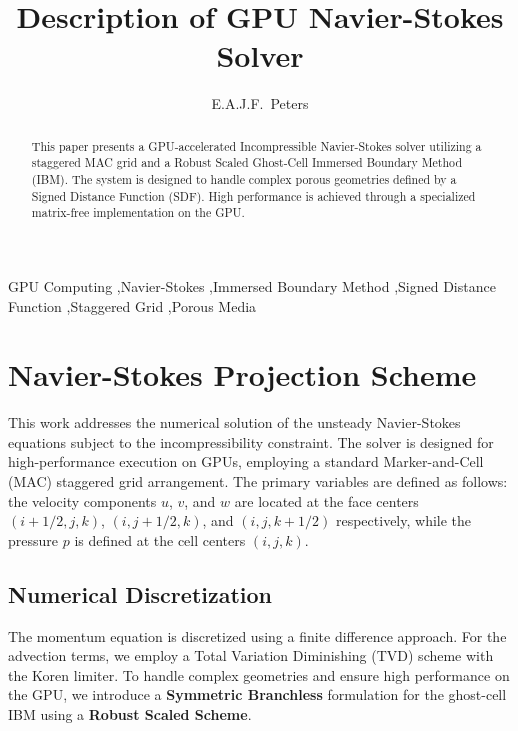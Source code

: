 \documentclass[preprint,12pt]{elsarticle}
\begin{document}
\begin{frontmatter}


\title{Description of GPU Navier-Stokes Solver}

\author{E.A.J.F.\ Peters}

\address{}

\begin{abstract}
This paper presents a GPU-accelerated Incompressible Navier-Stokes solver utilizing a staggered MAC grid and a Robust Scaled Ghost-Cell Immersed Boundary Method (IBM). The system is designed to handle complex porous geometries defined by a Signed Distance Function (SDF). High performance is achieved through a specialized matrix-free implementation on the GPU.
\end{abstract}

\begin{keyword}
GPU Computing \sep Navier-Stokes \sep Immersed Boundary Method \sep Signed Distance Function \sep Staggered Grid \sep Porous Media
\end{keyword}

\end{frontmatter}

\section{Navier-Stokes Projection Scheme}

This work addresses the numerical solution of the unsteady Navier-Stokes equations subject to the incompressibility constraint. The solver is designed for high-performance execution on GPUs, employing a standard Marker-and-Cell (MAC) staggered grid arrangement. The primary variables are defined as follows: the velocity components $u$, $v$, and $w$ are located at the face centers $(i+1/2, j, k)$, $(i, j+1/2, k)$, and $(i, j, k+1/2)$ respectively, while the pressure $p$ is defined at the cell centers $(i, j, k)$.

\subsection{Numerical Discretization}
The momentum equation is discretized using a finite difference approach. For the advection terms, we employ a Total Variation Diminishing (TVD) scheme with the Koren limiter. To handle complex geometries and ensure high performance on the GPU, we introduce a \textbf{Symmetric Branchless} formulation for the ghost-cell IBM using a \textbf{Robust Scaled Scheme}.
\end{document}
